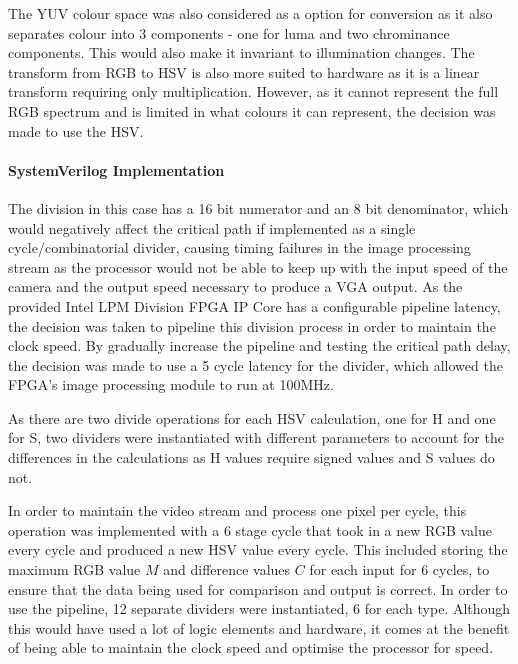 \documentclass[a4paper]{article}
\begin{document}
The YUV colour space was also considered as a option for conversion as it also
separates colour into 3 components - one for luma and two chrominance components.
This would also make it invariant to illumination changes. The transform from RGB
to HSV is also more suited to hardware as it is a linear transform requiring only
multiplication. However, as it cannot represent the full RGB spectrum and is 
limited in what colours it can represent, the decision was made to use the HSV. 

\paragraph*{SystemVerilog Implementation} 
The division in this case has a 16 bit numerator and an 8 bit denominator, which
would negatively affect the critical path if implemented as a single cycle/combinatorial
divider, causing timing failures in the image processing stream as the processor 
would not be able to keep up with the input speed of the camera and the
output speed necessary to produce a VGA output. As the provided Intel LPM Division FPGA 
IP Core has a configurable pipeline latency, the decision was taken to pipeline this division
process in order to maintain the clock speed. By gradually increase the pipeline 
and testing the critical path delay, the decision was made to use a 5 cycle latency
for the divider, which allowed the FPGA's image processing module to run at 100MHz. 

As there are two divide operations for each HSV calculation, one for H and one for S,
two dividers were instantiated with different parameters to account for the differences 
in the calculations as H values require signed values and S values do not. 

In order to maintain the video stream and process one pixel per cycle, this operation 
was implemented with a 6 stage cycle that took in a new RGB value every cycle and
produced a new HSV value every cycle. This included storing the maximum RGB value \( M \) and difference
values \(C \) for each input for 6 cycles, to ensure that the data being used for 
comparison and output is correct. In order to use the pipeline, 12 separate dividers
were instantiated, 6 for each type. Although this would have used a lot of logic 
elements and hardware, it comes at the benefit of being able to maintain the clock 
speed and optimise the processor for speed. 




   
\end{document}
